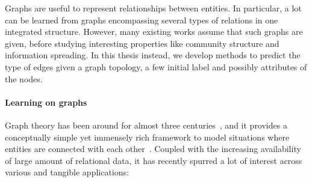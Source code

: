Graphs are useful to represent relationships between entities. In particular, a lot can be learned
from graphs encompassing several types of relations in one integrated structure. However, many
existing works assume that such graphs are given, before studying interesting properties like
community structure and information spreading. In this thesis instead, we develop methods to predict
the type of edges given a graph topology, a few initial label and possibly attributes of the nodes.
\smallskip

\paragraph{Learning on graphs}

Graph theory has been around for almost three centuries~\autocite{biggs1976graph}, and it provides a
conceptually simple yet immensely rich framework to model situations where entities are connected
with each other~\autocite{ComplexNetworksApp11}. Coupled with the increasing availability of large
amount of relational data, it has recently spurred a lot of interest across various and tangible
applications:
